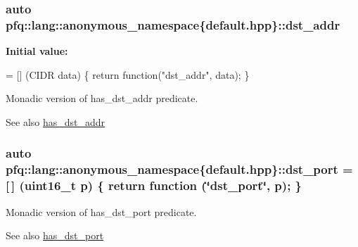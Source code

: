 \subsubsection[{\texorpdfstring{dst\+\_\+addr}{dst_addr}}]{\setlength{\rightskip}{0pt plus 5cm}auto pfq\+::lang\+::anonymous\+\_\+namespace\{default.\+hpp\}\+::dst\+\_\+addr}\hypertarget{namespacepfq_1_1lang_1_1anonymous__namespace_02default_8hpp_03_a3f51de44baa33ff19a94995945636072}{}\label{namespacepfq_1_1lang_1_1anonymous__namespace_02default_8hpp_03_a3f51de44baa33ff19a94995945636072}
{\bfseries Initial value\+:}
\begin{DoxyCode}
= [] (CIDR data)
        \{
            \textcolor{keywordflow}{return} \textcolor{keyword}{function}(\textcolor{stringliteral}{"dst\_addr"}, data);
        \}
\end{DoxyCode}


Monadic version of {\ttfamily has\+\_\+dst\+\_\+addr} predicate. 

\begin{DoxySeeAlso}{See also}
\hyperlink{namespacepfq_1_1lang_1_1anonymous__namespace_02default_8hpp_03_a0a53822af0ed8ea341f16a1da5ea83e3}{has\+\_\+dst\+\_\+addr} 
\end{DoxySeeAlso}
\subsubsection[{\texorpdfstring{dst\+\_\+port}{dst_port}}]{\setlength{\rightskip}{0pt plus 5cm}auto pfq\+::lang\+::anonymous\+\_\+namespace\{default.\+hpp\}\+::dst\+\_\+port = \mbox{[}$\,$\mbox{]} (uint16\+\_\+t p) \{ return {\bf function} (\char`\"{}dst\+\_\+port\char`\"{}, p); \}}\hypertarget{namespacepfq_1_1lang_1_1anonymous__namespace_02default_8hpp_03_a25a3b35caf255c109a6c5b4f601b1b61}{}\label{namespacepfq_1_1lang_1_1anonymous__namespace_02default_8hpp_03_a25a3b35caf255c109a6c5b4f601b1b61}


Monadic version of {\ttfamily has\+\_\+dst\+\_\+port} predicate. 

\begin{DoxySeeAlso}{See also}
\hyperlink{namespacepfq_1_1lang_1_1anonymous__namespace_02default_8hpp_03_afa71ece0f4178d0200c0388f503eef14}{has\+\_\+dst\+\_\+port} 
\end{DoxySeeAlso}

